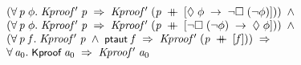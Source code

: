 \documentclass[letterpaper]{article}
\renewcommand{\HOLConst}[1]{{\textsf{\upshape\small #1}}}
\newenvironment{holmath}{\begin{displaymath}\begin{array}{l}}{\end{array}\end{displaymath}\ignorespacesafterend}
\begin{document}
\begin{holmath}
\;\;\;\;\;(\HOLSymConst{\HOLTokenForall{}}\HOLBoundVar{p}\;\HOLBoundVar{\ensuremath{\phi}}.\;\HOLFreeVar{Kproof\sp{\prime}}\;\HOLBoundVar{p}\;\HOLSymConst{\HOLTokenImp{}}\;\HOLFreeVar{Kproof\sp{\prime}}\;(\HOLBoundVar{p}\;\HOLSymConst{\HOLTokenDoublePlus}\;[\HOLSymConst{\ensuremath{\Diamond}}\;\HOLBoundVar{\ensuremath{\phi}}\;\HOLSymConst{\ensuremath{\rightarrow}}\;\HOLSymConst{\HOLTokenNeg{}}\HOLSymConst{\ensuremath{\Box}}\;(\HOLSymConst{\HOLTokenNeg{}}\HOLBoundVar{\ensuremath{\phi}})]))\;\HOLSymConst{\HOLTokenConj{}}\\
\;\;\;\;\;(\HOLSymConst{\HOLTokenForall{}}\HOLBoundVar{p}\;\HOLBoundVar{\ensuremath{\phi}}.\;\HOLFreeVar{Kproof\sp{\prime}}\;\HOLBoundVar{p}\;\HOLSymConst{\HOLTokenImp{}}\;\HOLFreeVar{Kproof\sp{\prime}}\;(\HOLBoundVar{p}\;\HOLSymConst{\HOLTokenDoublePlus}\;[\HOLSymConst{\HOLTokenNeg{}}\HOLSymConst{\ensuremath{\Box}}\;(\HOLSymConst{\HOLTokenNeg{}}\HOLBoundVar{\ensuremath{\phi}})\;\HOLSymConst{\ensuremath{\rightarrow}}\;\HOLSymConst{\ensuremath{\Diamond}}\;\HOLBoundVar{\ensuremath{\phi}}]))\;\HOLSymConst{\HOLTokenConj{}}\\
\;\;\;\;\;(\HOLSymConst{\HOLTokenForall{}}\HOLBoundVar{p}\;\HOLBoundVar{f}.\;\HOLFreeVar{Kproof\sp{\prime}}\;\HOLBoundVar{p}\;\HOLSymConst{\HOLTokenConj{}}\;\HOLConst{ptaut}\;\HOLBoundVar{f}\;\HOLSymConst{\HOLTokenImp{}}\;\HOLFreeVar{Kproof\sp{\prime}}\;(\HOLBoundVar{p}\;\HOLSymConst{\HOLTokenDoublePlus}\;[\HOLBoundVar{f}]))\;\HOLSymConst{\HOLTokenImp{}}\\
\;\;\;\;\;\HOLSymConst{\HOLTokenForall{}}\HOLBoundVar{a\sb{\mathrm{0}}}.\;\HOLConst{Kproof}\;\HOLBoundVar{a\sb{\mathrm{0}}}\;\HOLSymConst{\HOLTokenImp{}}\;\HOLFreeVar{Kproof\sp{\prime}}\;\HOLBoundVar{a\sb{\mathrm{0}}}
\end{holmath}
\end{document}
